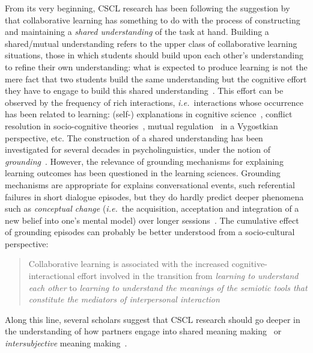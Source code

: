 \documentclass[natbib]{svjour3}
\newcommand{\ie}{{\textit{i.e.\ }}}
\begin{document}
From its very beginning, CSCL research has been following
the suggestion by \citet{roschelle1995construction} that collaborative learning has
something to do with the process of constructing and maintaining a \emph{shared
understanding} of the task at hand. Building a shared/mutual understanding
refers to the upper class of collaborative learning situations, those in which
students should build upon each other's understanding to refine their own
understanding: what is expected to produce learning is not the mere fact that
two students build the same understanding but the cognitive effort they have to
engage to build this shared understanding~\citep{schwartz1995emergence}. This
effort can be observed by the frequency of rich interactions, \ie interactions
whose occurrence has been related to learning: (self-) explanations in cognitive
science~\citep{chi1989self, webb1991task}, conflict resolution in
socio-cognitive theories~\citep{doise1975social},
mutual regulation~\citep{blaye1995collaborative} in a Vygostkian perspective, etc. The
construction of a shared understanding has been investigated for several decades
in psycholinguistics, under the  notion of
\emph{grounding}~\citep{clark1986referring}. However, the relevance of grounding
mechanisms for explaining learning outcomes has been questioned in the learning
sciences. Grounding mechanisms  are appropriate for explains conversational events, such
referential failures in short dialogue episodes, but they do  hardly predict deeper phenomena such as
\emph{conceptual change} (\ie the acquisition, acceptation and integration of a
new belief into one's mental model) over longer
sessions~\citep{dillenbourg2006sharing}. The cumulative effect of grounding
episodes can probably be better understood from a socio-cultural perspective:

\begin{quote}
Collaborative learning is associated with the increased
cognitive-interactional effort involved in the transition from \emph{learning to
understand each other} to \emph{learning to understand the meanings of the semiotic
tools that constitute the mediators of interpersonal
interaction}~\citep{baker1999role}
\end{quote}

Along this line, several scholars suggest that CSCL research should go deeper in
the understanding of how partners engage into shared meaning
making~\citep{stahl2007meaning} or \emph{intersubjective} meaning
making~\citep{suthers2006technology}.
\end{document}
